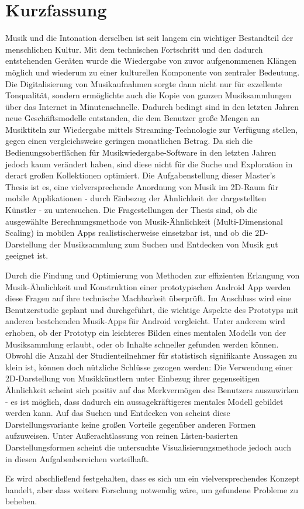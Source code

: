 \chapter*{Kurzfassung}

Musik und die Intonation derselben ist seit langem ein wichtiger Bestandteil der menschlichen Kultur. Mit dem technischen Fortschritt und den dadurch entstehenden Geräten wurde die Wiedergabe von zuvor aufgenommenen Klängen möglich und wiederum zu einer kulturellen Komponente von zentraler Bedeutung. Die Digitalisierung von Musikaufnahmen sorgte dann nicht nur für exzellente Tonqualität, sondern ermöglichte auch die Kopie von ganzen Musiksammlungen über das Internet in Minutenschnelle. Dadurch bedingt sind in den letzten Jahren neue Geschäftsmodelle entstanden, die dem Benutzer große Mengen an Musiktiteln zur Wiedergabe mittels Streaming-Technologie zur Verfügung stellen, gegen einen vergleichsweise geringen monatlichen Betrag. Da sich die Bedienungsoberflächen für Musikwiedergabe-Software in den letzten Jahren jedoch kaum verändert haben, sind diese nicht für die Suche und Exploration in derart großen Kollektionen optimiert. Die Aufgabenstellung dieser Master's Thesis ist es, eine vielversprechende Anordnung von Musik im 2D-Raum für mobile Applikationen - durch Einbezug der Ähnlichkeit der dargestellten Künstler - zu untersuchen. Die Fragestellungen der Thesis sind, ob die ausgewählte Berechnungsmethode von Musik-Ähnlichkeit (Multi-Dimensional Scaling) in mobilen Apps realistischerweise einsetzbar ist, und ob die 2D-Darstellung der Musiksammlung zum Suchen und Entdecken von Musik gut geeignet ist.

Durch die Findung und Optimierung von Methoden zur effizienten Erlangung von Musik-Ähnlichkeit und Konstruktion einer prototypischen Android App werden diese Fragen auf ihre technische Machbarkeit überprüft. Im Anschluss wird eine Benutzerstudie geplant und durchgeführt, die wichtige Aspekte des Prototyps mit anderen bestehenden Musik-Apps für Android vergleicht. Unter anderem wird erhoben, ob der Prototyp ein leichteres Bilden eines mentalen Modells von der Musiksammlung erlaubt, oder ob Inhalte schneller gefunden werden können. Obwohl die Anzahl der Studienteilnehmer für statistisch signifikante Aussagen zu klein ist, können doch nützliche Schlüsse gezogen werden: 
Die Verwendung einer 2D-Darstellung von Musikkünstlern unter Einbezug ihrer gegenseitigen Ähnlichkeit scheint sich positiv auf das Merkvermögen des Benutzers auszuwirken - es ist möglich, dass dadurch ein aussagekräftigeres mentales Modell gebildet werden kann. Auf das Suchen und Entdecken von scheint diese Darstellungsvariante keine großen Vorteile gegenüber anderen Formen aufzuweisen. Unter Außerachtlassung von reinen Listen-basierten Darstellungsformen scheint die untersuchte Visualisierungsmethode jedoch auch in diesen Aufgabenbereichen vorteilhaft. 

Es wird abschließend festgehalten, dass es sich um ein vielversprechendes Konzept handelt, aber dass weitere Forschung notwendig wäre, um gefundene Probleme zu beheben.